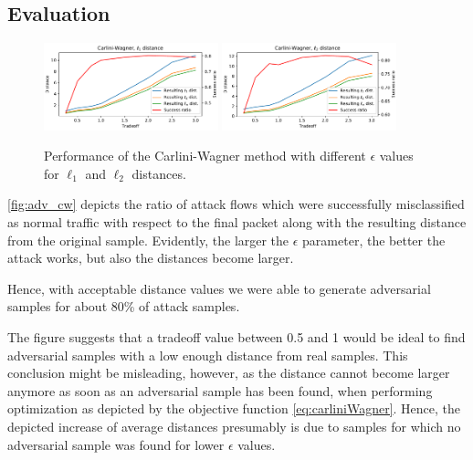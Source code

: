 \documentclass[sigconf,nonacm]{acmart}
\begin{document}
\subsection{Evaluation}
\begin{figure}
\includegraphics[width=0.45\textwidth]{adv_plots/cwl1.pdf}
\includegraphics[width=0.45\textwidth]{adv_plots/cwl2.pdf}
\caption{Performance of the Carlini-Wagner method with different $\epsilon$ values for $\ell_1$ and $\ell_2$ distances.}
\label{fig:adv_cw}
\end{figure}
\autoref{fig:adv_cw} depicts the ratio of attack flows which were successfully misclassified as normal traffic with respect to the final packet along with the resulting distance from the original sample. Evidently, the larger the $\epsilon$ parameter, the better the attack works, but also the distances become larger.

Hence, with acceptable distance values we were able to generate adversarial samples for about 80\% of attack samples.

The figure suggests that a tradeoff value between 0.5 and 1 would be ideal to find adversarial samples with a low enough distance from real samples. This conclusion might be misleading, however, as the distance cannot become larger anymore as soon as an adversarial sample has been found, when performing optimization as depicted by the objective function \eqref{eq:carliniWagner}. Hence, the depicted increase of average distances presumably is due to samples for which no adversarial sample was found for lower $\epsilon$ values.
\end{document}
